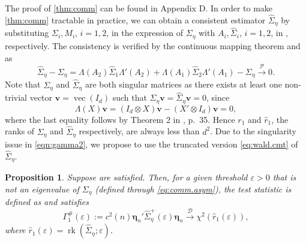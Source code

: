 \documentclass[12pt]{article}
\numberwithin{thm}{section}
\numberwithin{defn}{section}
\numberwithin{lem}{section}
\newtheorem{prop}{Proposition}
\numberwithin{prop}{section}
\numberwithin{cor}{section}
\numberwithin{rem}{section}
\DeclareMathOperator{\Vector}{vec}
\newcommand{\rank}{\operatorname{rk}}
\begin{document}
The proof of \autoref{thm:comm} can be found in {\color{cyan} Appendix D}. In order to make \autoref{thm:comm} tractable in practice, we can obtain a consistent estimator $\widehat{\Sigma}_\eta$ by substituting $\Sigma_{i}, M_{i}$, $i=1,2$, in the expression of $\Sigma_\eta$ with $A_{i},\widehat{\Sigma}_{i}$, $i=1,2$, in , respectively. The consistency is verified by the continuous mapping theorem and  as
$$
\widehat{\Sigma}_\eta - \Sigma_\eta = \Lambda(A_2) \widehat{\Sigma}_1 \Lambda'(A_2) + \Lambda(A_1) \widehat{\Sigma}_2 \Lambda'(A_1) - \Sigma_\eta \xrightarrow{\mathcal{P}} 0.
$$
Note that $\Sigma_\eta$ and $\widehat{\Sigma}_\eta$ are both singular matrices as there exists at least one non-trivial vector $\bm{v} = \Vector(I_d)$ such that $\Sigma_\eta \bm{v} = \widehat{\Sigma}_\eta \bm{v} = 0$, since
$$\Lambda(X)\bm{v} = (I_d \otimes X)\bm{v} - (X' \otimes I_d)\bm{v} =0,$$
where the last equality follows by Theorem 2 in \cite{magnus2019matrix}, p.\ 35.
Hence $r_1$ and $\hat{r}_1$, the ranks of $\Sigma_\eta$ and $\widehat{\Sigma}_\eta$ respectively, are always less than $d^2$. Due to the singularity issue
in \eqref{eqn:gamma2}, we propose to use the truncated version \eqref{eq:wald.cmt} of $\widehat{\Sigma}_\eta$.

\begin{prop}\label{thm:comm.Est}
Suppose  are satisfied. Then, for a given threshold $\varepsilon > 0$ that is not an eigenvalue of $\Sigma_{\eta}$ (defined through \eqref{eq:comm.asym}),
the test statistic is defined as and satisfies
\begin{equation}\label{eq:gamma2.est}
    \Gamma_1^\#(\varepsilon) := c^2(n) \bm{\eta}_n' \widehat{\Sigma}_\eta^+(\varepsilon) \bm{\eta}_n \xrightarrow{\mathcal{D}} \chi^2(\widehat{r}_1(\varepsilon)),
\end{equation}
where $\widehat{r}_1(\varepsilon) = \rank(\widehat{\Sigma}_\eta; \varepsilon)$.%
\end{prop}



\end{document}
